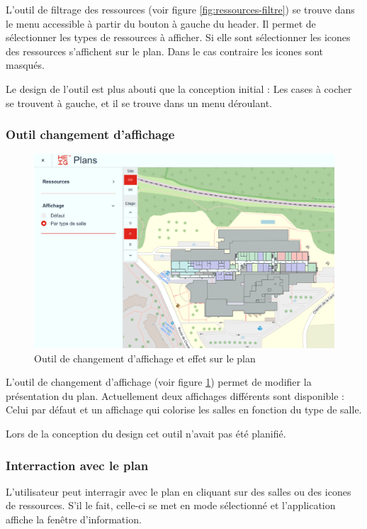 \documentclass[
    iai, %
    il, %
]{heig-tb}
\begin{document}
L'outil de filtrage des ressources (voir figure \ref{fig:ressources-filtre}) se trouve dans le menu accessible à partir du bouton à gauche du header.
Il permet de sélectionner les types de ressources à afficher.
Si elle sont sélectionner les icones des ressources s'affichent sur le plan.
Dans le cas contraire les icones sont masqués.

Le design de l'outil est plus abouti que la conception initial : Les cases à cocher se trouvent à gauche, et
il se trouve dans un menu déroulant.

\subsubsection{Outil changement d'affichage}

\begin{figure}[h]
    \centering
    \includegraphics[scale=0.4]{frontend-affichageParType.png}
    \caption{Outil de changement d'affichage et effet sur le plan}
    \label{fig:affichage}
\end{figure}

L'outil de changement d'affichage (voir figure \ref{fig:affichage}) permet de modifier la présentation du plan.
Actuellement deux affichages différents sont disponible :
Celui par défaut et un affichage qui colorise les salles en fonction du type de salle.

Lors de la conception du design cet outil n'avait pas été planifié.

\subsubsection{Interraction avec le plan}
L'utilisateur peut interragir avec le plan en cliquant sur des salles ou des icones de ressources.
S'il le fait, celle-ci se met en mode sélectionné et l'application affiche la fenêtre d'information.
\end{document}
